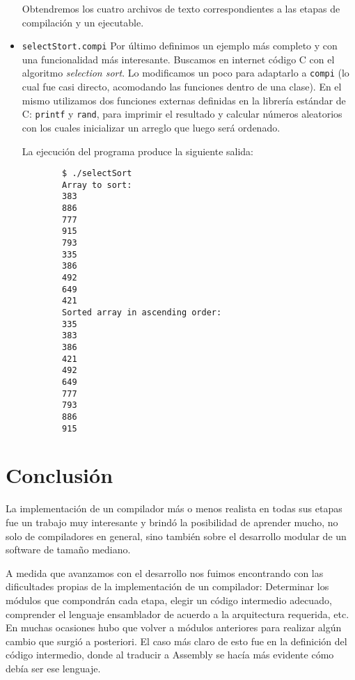 \documentclass[a4paper,10pt]{article}
\begin{document}
\begin{itemize}
		  \noindent Obtendremos los cuatro archivos de texto correspondientes a las etapas de compilación y un ejecutable.
      
  \item \verb|selectStort.compi| Por último definimos un ejemplo más completo y con una funcionalidad más interesante. Buscamos
				 en internet código C con el algoritmo \textit{selection sort}. Lo modificamos un poco para adaptarlo a \verb|compi| 
				 (lo cual fue casi directo, acomodando las funciones dentro de una clase). En el mismo utilizamos dos funciones externas
				 definidas en la librería estándar de C: \verb|printf| y \verb|rand|, para imprimir el resultado y calcular números aleatorios
				 con los cuales inicializar un arreglo que luego será ordenado.
				 
				 La ejecución del programa produce la siguiente salida:
				 
	\begin{center}
	 \begin{verbatim}
	    $ ./selectSort 
	    Array to sort:
	    383
	    886
	    777
	    915
	    793
	    335
	    386
	    492
	    649
	    421
	    Sorted array in ascending order:
	    335
	    383
	    386
	    421
	    492
	    649
	    777
	    793
	    886
	    915
	 \end{verbatim}
	\end{center}

				 
      
\end{itemize}


 
\section{Conclusión}

La implementación de un compilador más o menos realista en todas sus etapas fue un trabajo muy interesante y brindó la posibilidad de aprender 
mucho, no solo de compiladores en general, sino también sobre el desarrollo modular de un software de tamaño mediano.

A medida que avanzamos con el desarrollo nos fuimos encontrando con las dificultades propias de la implementación de un compilador: 
Determinar los módulos que compondrán cada etapa, elegir un código intermedio adecuado, comprender el lenguaje ensamblador de acuerdo a la arquitectura
requerida, etc. En muchas ocasiones hubo que volver a módulos anteriores para realizar algún cambio que surgió a posteriori. El caso
más claro de esto fue en la definición del código intermedio, donde al traducir a Assembly se hacía más evidente cómo debía ser ese lenguaje.
\end{document}
